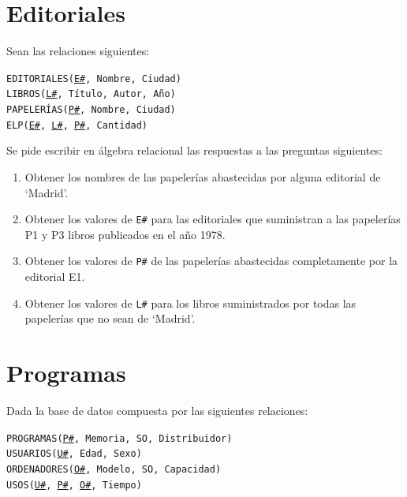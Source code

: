 \documentclass[a4paper]{article}
\begin{document}
\section{Editoriales}

Sean las relaciones siguientes:

\begin{addmargin}[1.5em]{0em}
    \texttt{EDITORIALES(\underline{E\#}, Nombre, Ciudad)}\\
    \texttt{LIBROS(\underline{L\#}, Título, Autor, Año)}\\
    \texttt{PAPELERÍAS(\underline{P\#}, Nombre, Ciudad)}\\
    \texttt{ELP(\underline{E\#}, \underline{L\#}, \underline{P\#}, Cantidad)}
\end{addmargin}


Se pide escribir en álgebra relacional las respuestas a las preguntas siguientes:

\begin{enumerate}
    \item Obtener los nombres de las papelerías abastecidas por alguna editorial de `Madrid'.
    \item Obtener los valores de \texttt{E\#} para las editoriales que suministran a las papelerías P1 y P3 libros publicados en el año 1978.
    \item Obtener los valores de \texttt{P\#} de las papelerías abastecidas completamente por la editorial E1.
    \item Obtener los valores de \texttt{L\#} para los libros suministrados por todas las papelerías que no sean de `Madrid'.
\end{enumerate}

\section{Programas}

Dada la base de datos compuesta por las siguientes relaciones:

\begin{addmargin}[1.5em]{0em}
    \texttt{PROGRAMAS(\underline{P\#}, Memoria, SO, Distribuidor)}\\
    \texttt{USUARIOS(\underline{U\#}, Edad, Sexo)}\\
    \texttt{ORDENADORES(\underline{O\#}, Modelo, SO, Capacidad)}\\
    \texttt{USOS(\underline{U\#}, \underline{P\#}, \underline{O\#}, Tiempo)}
\end{addmargin}
\end{document}
